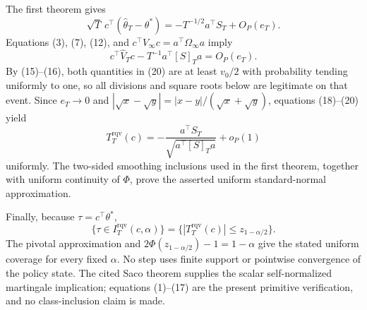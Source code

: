 The first theorem gives
\[
 \sqrt T\,c^\top(\widehat\theta_T-\theta^*)
 =-T^{-1/2}a^\top S_T+O_P(e_T). \tag{19}
\]
Equations (3), (7), (12), and \(c^\top V_\infty c=a^\top\Omega_\infty a\) imply
\[
 c^\top\widehat V_Tc-T^{-1}a^\top[S]_Ta=O_P(e_T). \tag{20}
\]
By (15)--(16), both quantities in (20) are at least \(v_0/2\) with probability tending uniformly to one, so all divisions and square roots below are legitimate on that event. Since \(e_T\to0\) and \(|\sqrt x-\sqrt y|=|x-y|/(\sqrt x+\sqrt y)\), equations (18)--(20) yield
\[
 T_T^{\mathrm{rqv}}(c)
 =-\frac{a^\top S_T}{\sqrt{a^\top[S]_Ta}}+o_P(1) \tag{21}
\]
uniformly. The two-sided smoothing inclusions used in the first theorem, together with uniform continuity of \(\Phi\), prove the asserted uniform standard-normal approximation.

Finally, because \(\tau=c^\top\theta^*\),
\[
 \{\tau\in I_T^{\mathrm{rqv}}(c,\alpha)\}
 =\{|T_T^{\mathrm{rqv}}(c)|\le z_{1-\alpha/2}\}. \tag{22}
\]
The pivotal approximation and \(2\Phi(z_{1-\alpha/2})-1=1-\alpha\) give the stated uniform coverage for every fixed \(\alpha\). No step uses finite support or pointwise convergence of the policy state. The cited Saco theorem supplies the scalar self-normalized martingale implication; equations (1)--(17) are the present primitive verification, and no class-inclusion claim is made.